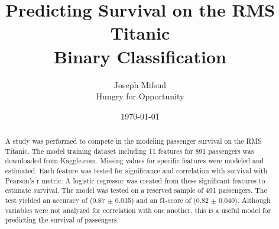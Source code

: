 \documentclass[10pt]{article}
\title{Predicting Survival on the RMS Titanic\\
	\large{Binary Classification}}
\author{	Joseph Mifsud  \\
		Hungry for Opportunity}
\date{\today}
\begin{document}
\maketitle
\begin{abstract}

	A study was performed to compete in the modeling passenger survival on the RMS Titanic.
	The model training dataset including 11 features for 891 passengers was downloaded from Kaggle.com.
	Missing values for specific features were modeled and estimated.
	Each feature was tested for significance and correlation with survival with Pearson's r metric.
	A logistic regressor was created from these significant features to estimate survival.
	The model was tested on a reserved sample of 491 passengers.
	The test yielded an accuracy of (0.87 $\pm$ 0.035) and an f1-score of (0.82 $\pm$ 0.040).
	Although variables were not analyzed for correlation with one another, this is a useful model for predicting the survival of passengers.

\end{abstract}
\end{document}

